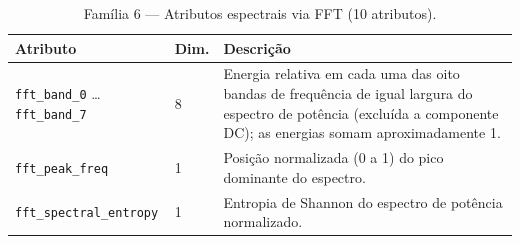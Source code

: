 \begin{table}[htb]
\centering
\caption{Família 6 --- Atributos espectrais via FFT (10 atributos).}
\begin{tabular}{llp{7.5cm}}
\toprule
Atributo & Dim. & Descrição \\
\midrule
\texttt{fft\_band\_0} \ldots \texttt{fft\_band\_7} & 8 & Energia relativa em cada uma das oito bandas de frequência de igual largura do espectro de potência (excluída a componente DC); as energias somam aproximadamente 1. \\
\texttt{fft\_peak\_freq}        & 1 & Posição normalizada (0 a 1) do pico dominante do espectro. \\
\texttt{fft\_spectral\_entropy} & 1 & Entropia de Shannon do espectro de potência normalizado. \\
\bottomrule
\end{tabular}
\end{table}
